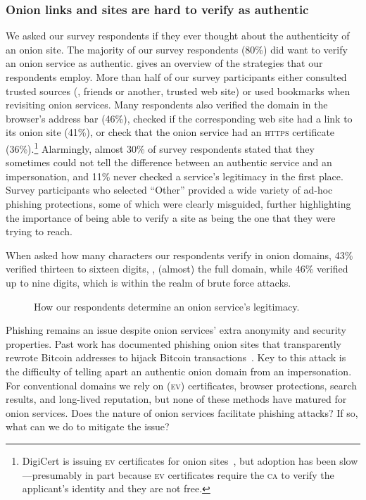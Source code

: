 \subsubsection{Onion links and sites are hard to verify as authentic}
We asked our survey respondents if they ever thought about the authenticity of an onion
site.  The majority of our survey respondents (80\%) did want to verify an onion service as authentic.   gives an overview of the
strategies that our respondents employ.  More than half of our survey participants either consulted trusted
sources (\eg, friends or another, trusted web site) or used bookmarks when
revisiting onion services.  Many respondents also verified the domain in the
browser's address bar (46\%), checked if the corresponding web site had a link to
its onion site (41\%), or check that the onion service had an \textsc{https}
certificate (36\%).\footnote{DigiCert is issuing \textsc{ev} certificates for
onion sites~\cite{DigiCert2015a}, but adoption has been slow---presumably in part
because \textsc{ev} certificates require the \textsc{ca} to verify the
applicant's identity and they are not free.}  Alarmingly, almost 30\% of
survey respondents stated that they sometimes could not tell the difference between an
authentic service and an impersonation, and 11\% never checked a service's
legitimacy in the first place.  Survey participants who selected ``Other'' provided a wide
variety of ad-hoc phishing protections, some of which were clearly misguided, 
further highlighting the importance of being able to verify a site as being the one that they were trying to reach.

When asked how many characters our respondents verify in
onion domains,  43\% verified thirteen to sixteen digits, \ie, (almost) the full
domain, while 46\% verified up to nine digits, which is within the realm of brute
force attacks.

\begin{figure}[t]
    \centering
    
    \caption{How our respondents determine an onion service's legitimacy.}
    \label{fig:determining-legitimacy}
\end{figure}

Phishing remains an issue despite onion services' extra anonymity and security
properties.  Past work has documented phishing onion sites that transparently
rewrote Bitcoin addresses to hijack Bitcoin
transactions~\cite{Winter2016a,Nurmi2015a,Monteiro2016a}.  Key to this attack is
the difficulty of telling apart an authentic onion domain from an impersonation.
For conventional domains we rely on (\textsc{ev}) certificates, browser
protections, search results, and long-lived reputation, but none of these
methods have matured for onion services.  Does the nature of onion services
facilitate phishing attacks?  If so, what can we do to mitigate the issue?

